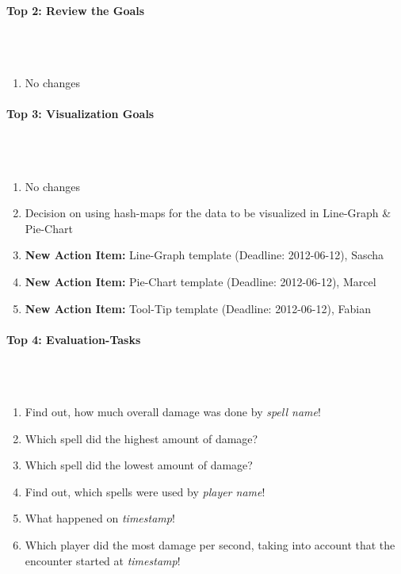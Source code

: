 \documentclass{scrartcl}
\begin{document}
\paragraph{Top 2: Review the Goals}
\hfill \\ \hfill \\
\begin {enumerate}
\item No changes
\end {enumerate}

\paragraph{Top 3: Visualization Goals}
\hfill \\ \hfill \\
\begin {enumerate}
\item No changes
\item Decision on using hash-maps for the data to be visualized in Line-Graph \& Pie-Chart
\item \textbf{New Action Item:} Line-Graph template (Deadline: 2012-06-12), Sascha 
\item \textbf{New Action Item:} Pie-Chart template (Deadline: 2012-06-12), Marcel 
\item \textbf{New Action Item:} Tool-Tip template (Deadline: 2012-06-12), Fabian 
\end {enumerate}

\paragraph{Top 4: Evaluation-Tasks}
\hfill \\ \hfill \\
\begin {enumerate}
\item Find out, how much overall damage was done by \emph{spell name}!
\item Which spell did the highest amount of damage?
\item Which spell did the lowest amount of damage?
\item Find out, which spells were used by \emph{player name}!
\item What happened on \emph{timestamp}!
\item Which player did the most damage per second, taking into account that the encounter started at \emph{timestamp}!
\end {enumerate}
\end{document}
